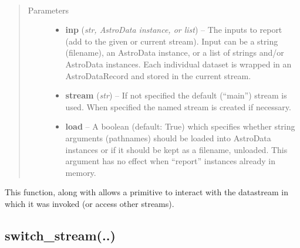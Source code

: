 \documentclass[letterpaper,10pt,english]{sphinxmanual}
\begin{document}
\begin{fulllineitems}
\label{chapter_ReductionContextClass:astrodata.RecipeManager.ReductionContext.report_output}~\begin{quote}\begin{description}
\item[{Parameters}] \leavevmode\begin{itemize}
\item {} 
\textbf{inp} (\emph{str, AstroData instance, or list}) -- The inputs to report (add to the given or current stream).
Input can be a string (filename), an AstroData instance, or a list of
strings and/or AstroData instances.  Each individual dataset is
wrapped in an AstroDataRecord and stored in the current stream.

\item {} 
\textbf{stream} (\emph{str}) -- If not specified the default (``main'') stream is used.
When specified the named stream is created if necessary.

\item {} 
\textbf{load} -- A boolean (default: True) which specifies whether string
arguments (pathnames) should be loaded into AstroData instances
or if it should be kept as a filename, unloaded.  This argument
has no effect when ``report''
 instances already in memory.

\end{itemize}

\end{description}\end{quote}

This function, along with  allows a primitive to
interact with the datastream in which it was invoked (or access
other streams).

\end{fulllineitems}



\subsection{switch\_stream(..)}
\label{chapter_ReductionContextClass:switch-stream}
\end{document}
